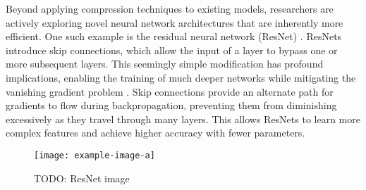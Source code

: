 Beyond applying compression techniques to existing models, researchers are actively exploring novel neural network architectures that are inherently more efficient.
One such example is the residual neural network (ResNet) \autocite{heDeepResidualLearning2015}.
ResNets introduce skip connections, which allow the input of a layer to bypass one or more subsequent layers.
This seemingly simple modification has profound implications, enabling the training of much deeper networks while mitigating the vanishing gradient problem \cite{pascanuDifficultyTrainingRecurrent2012}.
Skip connections provide an alternate path for gradients to flow during backpropagation, preventing them from diminishing excessively as they travel through many layers.
This allows ResNets to learn more complex features and achieve higher accuracy with fewer parameters. 

\begin{figure}[hbtp]
\centering    
\texttt{[image: example-image-a]}
\caption{TODO: ResNet image}
\end{figure}